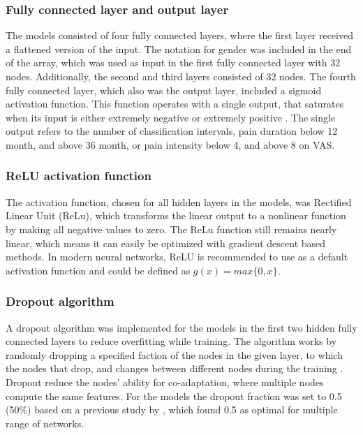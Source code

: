 \subsubsection*{\textbf{Fully connected layer and output layer}}
The models consisted of four fully connected layers, where the first layer received a flattened version of the input. The notation for gender was included in the end of the array, which was used as input in the first fully connected layer with 32 nodes. Additionally, the second and third layers consisted of 32 nodes. The fourth fully connected layer, which also was the output layer, included a sigmoid activation function. 
This function operates with a single output, that saturates when its input is either extremely negative or extremely positive \citep{Goodfellow2016}. The single output refers to the number of classification intervals, pain duration below 12 month, and above 36 month, or pain intensity below 4, and above 8 on VAS. 

\subsubsection*{\textbf{ReLU activation function}}
The activation function, chosen for all hidden layers in the models, was Rectified Linear Unit (ReLu), which transforms the linear output to a nonlinear function by making all negative values to zero. The ReLu function still remains nearly linear, which means it can easily be optimized with gradient descent based methods. In modern neural networks, ReLU is recommended to use as a default activation function and could be defined as $g(x) = max\{0, x\}$.\citep{Goodfellow2016}

\subsubsection*{\textbf{Dropout algorithm}}
A dropout algorithm was implemented for the models in the first two hidden fully connected layers to reduce overfitting while training. The algorithm works by randomly dropping a specified faction of the nodes in the given layer, to which the nodes that drop, and changes between different nodes during the training \citep{Srivastava2014}. Dropout reduce the nodes’ ability for co-adaptation, where multiple nodes compute the same features. For the models the dropout fraction was set to 0.5 (50\%) based on a previous study by \citeauthor{Srivastava2014} \citep{Srivastava2014}, which found 0.5 as optimal for multiple range of networks.

